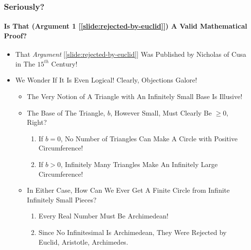 \begin{frame}
\frametitle{Seriously?}
\framesubtitle{Is That (\alert{Argument 1} [\ref{slide:rejected-by-euclid}]) A Valid Mathematical Proof?}
\label{slide:objections-to-nic}
\begin{itemize}
\pause
\item That \textit{Argument} [\ref{slide:rejected-by-euclid}] Was Published by \alert {Nicholas of Cusa in The $15^{th}$ Century}!
\pause
\item We Wonder If It Is Even Logical! Clearly, \alert{Objections Galore}!
\begin{itemize}
\pause
\item The \alert{Very Notion of A Triangle with An Infinitely Small Base Is Illusive}!
\pause
\item The Base of The Triangle, $b$, \alert{However Small}, Must Clearly Be $\geq0$, Right?
\pause
\begin{enumerate}
\item If $b=0$, \alert{No Number of Triangles Can Make A Circle with Positive Circumference}!
\item If $b>0$, \alert{Infinitely Many Triangles Make An Infinitely Large Circumference}!
\end{enumerate}
\pause
\item In Either Case, How Can We Ever Get \alert{A Finite Circle from Infinite Infinitely Small Pieces}?
\begin{enumerate}
\pause \item Every Real Number Must Be Archimedean!
\pause \item Since \alert{No Infinitesimal Is Archimedean}, They Were Rejected by Euclid, Aristotle, Archimedes.
\end{enumerate}
\end{itemize}
\end{itemize}
\end{frame}
